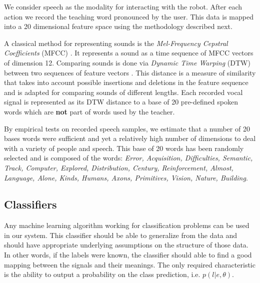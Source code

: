 We consider speech as the modality for interacting with the robot. After each action we record the teaching word pronounced by the user. This data is mapped into a 20 dimensional feature space using the methodology described next.  

A classical method for representing sounds is the \textit{Mel-Frequency Cepstral Coefficients} (MFCC) \cite{zheng2001comparison}. It represents a sound as a time sequence of MFCC vectors of dimension 12. Comparing sounds is done via \textit{Dynamic Time Warping} (DTW) between two sequences of feature vectors \cite{sakoe1978dynamic}. This distance is a measure of similarity that takes into account possible insertions and deletions in the feature sequence and is adapted for comparing sounds of different lengths. Each recorded vocal signal is represented as its DTW distance to a base of 20 pre-defined spoken words which are \textbf{not} part of words used by the teacher.

By empirical tests on recorded speech samples, we estimate that a number of 20 bases words were sufficient and yet a relatively high number of dimensions to deal with a variety of people and speech. This base of 20 words has been randomly selected and is composed of the words:\emph{ \footnotesize{Error, Acquisition, Difficulties, Semantic, Track, Computer, Explored, Distribution, Century, Reinforcement, Almost, Language, Alone, Kinds, Humans, Axons, Primitives, Vision, Nature, Building}}.

\subsection{Classifiers}

Any machine learning algorithm working for classification problems can be used in our system. This classifier should be able to generalize from the data and should have appropriate underlying assumptions on the structure of those data. In other words, if the labels were known, the classifier should able to find a good mapping between the signals and their meanings. The only required characteristic is the ability to output a probability on the class prediction, i.e. $p(l|e, \theta)$.

